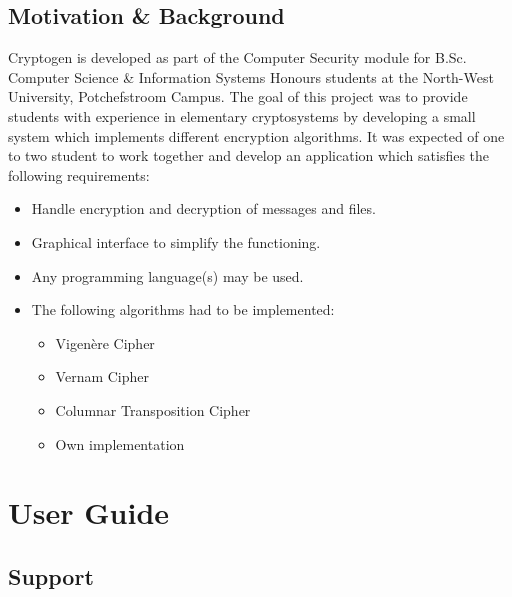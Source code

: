 \documentclass[11pt]{article}
\begin{document}
	\subsection{Motivation \& Background}
	Cryptogen is developed as part of the Computer Security module for B.Sc. Computer Science \& Information Systems Honours students at the North-West University, Potchefstroom Campus. The goal of this project was to provide students with experience in elementary cryptosystems by developing a small
	system which implements different encryption algorithms. It was expected of one to two student to work together and develop an application which satisfies the following requirements:
	\begin{itemize}
		\item Handle encryption and decryption of messages and files.
		\item Graphical interface to simplify the functioning.
		\item Any programming language(s) may be used.
		\item The following algorithms had to be implemented:
		\begin{itemize}
			\item Vigen\`{e}re Cipher
			\item Vernam Cipher
			\item Columnar Transposition Cipher
			\item Own implementation
		\end{itemize}
	\end{itemize}

	\section{User Guide}
	\subsection{Support}
\end{document}
